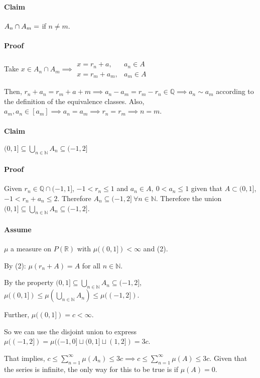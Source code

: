 \paragraph{Claim}
$A_n \cap A_m = \empty$ if $n\neq m$.

\paragraph{Proof}
Take $x \in A_n \cap A_m \implies \begin{array}{ll} x = r_n + a, & a_n \in A\\ x = r_m + a_m, & a_m \in A \end{array}$

Then, $r_n + a_n = r_m + a+m  \implies a_n - a_m = r_m - r_n \in \mathbb{Q} \implies a_n \sim a_m$ according to the definition of the equivalence classes. Also, $a_m, a_n \in [a_m] \implies a_n = a_m \implies r_n = r_m \implies n=m$.

\paragraph{Claim}
$(0,1] \subseteq \bigcup_{n\in\mathbb{N}}A_n \subseteq (-1,2]$ 

\paragraph{Proof}
Given $r_n \in \mathbb{Q}\cap (-1,1]$, $-1< r_n \leq 1$ and $a_n \in A,\ 0<a_n\leq 1$ given that $A\subset (0,1]$, $-1 < r_n + a_n \leq 2$. Therefore $A_n \subseteq (-1,2]\ \forall n\in\mathbb{N}$. Therefore the union $(0,1] \subseteq \bigcup_{n\in\mathbb{N}}A_n \subseteq (-1,2]$.


\paragraph{Assume} $\mu$ a measure on $P(\mathbb{R})$ with $\mu((0,1]) < \infty$ and (2). 

By (2):  $\mu(r_n + A) = A$ for all $n\in\mathbb{N}$.

By the property $(0,1] \subseteq \bigcup_{n\in\mathbb{N}}A_n \subseteq (-1,2]$, $\mu((0,1]) \leq \mu(\bigcup_{n\in \mathbb{N}} A_n) \leq \mu((-1,2])$. 
	
Further, $\mu((0,1]) = c < \infty$. 

So we can use the disjoint union to express $\mu((-1,2]) = \mu((-1,0] \sqcup (0,1] \sqcup (1,2]) = 3c$. 

That implies, $c \leq \sum_{n=1}^{\infty}\mu(A_n) \leq 3c \implies c \leq \sum_{n=1}^{\infty}\mu(A) \leq 3c$. Given that the series is infinite, the only way for this to be true is if $\mu(A)=0$. 

